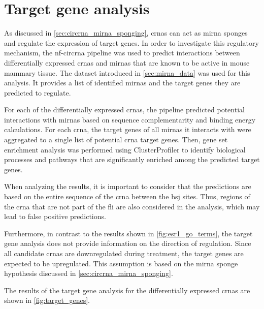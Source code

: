 \section{Target gene analysis}

As discussed in \cref{sec:circrna_mirna_sponging}, \glspl{crna} can act as
\gls{mirna} sponges and regulate the expression of target genes.
In order to investigate this regulatory mechanism, the \gls{nf-circrna}
pipeline was used to predict interactions between differentially expressed
\glspl{crna} and \glspl{mirna} that are known to be active in mouse mammary
tissue.
The dataset introduced in \cref{sec:mirna_data} was used for this analysis.
It provides a list of identified \glspl{mirna} and the target genes they are
predicted to regulate.

For each of the differentially expressed \glspl{crna}, the pipeline predicted
potential interactions with \glspl{mirna} based on sequence complementarity and
binding energy calculations.
For each \gls{crna}, the target genes of all \glspl{mirna} it interacts with
were aggregated to a single list of potential \gls{crna} target genes.
Then, gene set enrichment analysis was performed using ClusterProfiler to
identify biological processes and pathways that are significantly enriched
among the predicted target genes.

When analyzing the results, it is important to consider that the predictions
are based on the entire sequence of the \gls{crna} between the \gls{bsj} sites.
Thus, regions of the \gls{crna} that are not part of the \gls{fli} are also
considered in the analysis, which may lead to false positive predictions.

Furthermore, in contrast to the results shown in \cref{fig:esr1_go_terms}, the
target gene analysis does not provide information on the direction of
regulation.
Since all candidate \glspl{crna} are downregulated during treatment, the target
genes are expected to be upregulated.
This assumption is based on the \gls{mirna} sponge hypothesis discussed in
\cref{sec:circrna_mirna_sponging}.

The results of the target gene analysis for the differentially expressed
\glspl{crna} are shown in \cref{fig:target_genes}.


